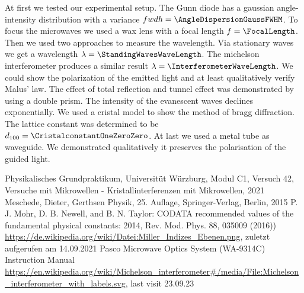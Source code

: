 \documentclass[a4paper,10pt,twocolumn]{article}
\begin{document}
    At first we tested our experimental setup.
    The Gunn diode has a gaussian angle-intensity distribution with a variance $fwdh = \AngleDispersionGaussFWHM$.
    To focus the microwaves we used a wax lens with a focal length $f = \FocalLength$.
    Then we used two approaches to measure the wavelength. 
    Via stationary waves we get a wavelength $\lambda = \StandingWavesWaveLength$.
    The michelson interferometer produces a similar result $\lambda = \InterferometerWaveLength $.
    We could show the polarization of the emitted light and at least qualitatively verify Malus' law. 
    The effect of total reflection and tunnel effect was demonstrated by using a double prism.
    The intensity of the evanescent waves declines exponentially.
    We used a cristal model to show the method of bragg diffraction.
    The lattice constant was determined to be $d_{100} = \CristalconstantOneZeroZero$.
    At last we used a metal tube as waveguide.
    We demonstrated qualitatively it preserves the polarisation of the guided light.
    
    
    \begin{thebibliography}{}    %
         Physikalisches Grundpraktikum, Universitüt Würzburg, Modul C1, Versuch 42, Versuche mit Mikrowellen - Kristallinterferenzen mit Mikrowellen, 2021
         Meschede, Dieter, Gerthsen Physik, 25. Auflage, Springer-Verlag, Berlin, 2015
         P. J. Mohr, D. B. Newell, and B. N. Taylor: \grqq CODATA
        recommended values of the fundamental physical constants: 2014\grqq , Rev. Mod. Phys.
        88, 035009 (2016))
         \url{https://de.wikipedia.org/wiki/Datei:Miller_Indizes_Ebenen.png}, zuletzt aufgerufen am 14.09.2021
         Pasco Microwave Optics System (WA-9314C) Instruction Manual
         \url{https://en.wikipedia.org/wiki/Michelson_interferometer#/media/File:Michelson_interferometer_with_labels.svg}, last visit 23.09.23
    \end{thebibliography}
    
\end{document}
